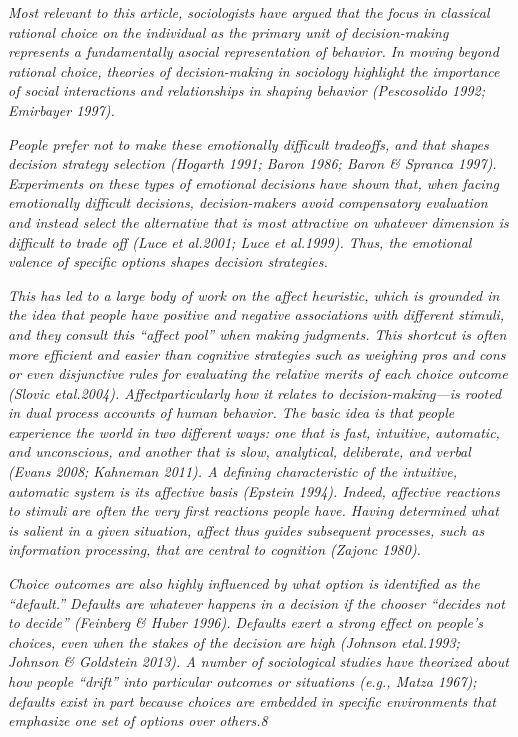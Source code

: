 \documentclass[]{article}
\begin{document}
\textit{Most relevant to this article, sociologists have argued that the focus in classical rational choice on the individual as the primary unit of decision-making represents a fundamentally asocial representation of behavior. In moving beyond rational choice, theories of decision-making in sociology highlight the importance of social interactions and relationships in shaping behavior (Pescosolido 1992; Emirbayer 1997).}

\textit{People prefer not to make these emotionally difficult tradeoffs, and that shapes decision strategy selection (Hogarth 1991; Baron 1986; Baron \& Spranca 1997). Experiments on these types of emotional decisions have shown that, when facing emotionally difficult decisions, decision-makers avoid compensatory evaluation and instead select the alternative that is most attractive on whatever dimension is difficult to trade off (Luce et al.2001; Luce et al.1999). Thus, the emotional valence of specific options shapes decision strategies.}

\textit{This has led to a large body of work on the affect heuristic, which is grounded in the idea that people have positive and negative associations with different stimuli, and they consult this “affect pool” when making judgments. This shortcut is often more efficient and easier than cognitive strategies such as weighing pros and cons or even disjunctive rules for evaluating the relative merits of each choice outcome (Slovic etal.2004). Affectparticularly how it relates to decision-making—is rooted in dual process accounts of human behavior. The basic idea is that people experience the world in two different ways: one that is fast, intuitive, automatic, and unconscious, and another that is slow, analytical, deliberate, and verbal (Evans 2008; Kahneman 2011). A defining characteristic of the intuitive, automatic system is its affective basis (Epstein 1994). Indeed, affective reactions to stimuli are often the very first reactions people have. Having determined what is salient in a given situation, affect thus guides subsequent processes, such as information processing, that are central to cognition (Zajonc 1980).}

\textit{Choice outcomes are also highly influenced by what option is identified as the “default.” Defaults are whatever happens in a decision if the chooser “decides not to decide” (Feinberg \& Huber 1996). Defaults exert a strong effect on people’s choices, even when the stakes of the decision are high (Johnson etal.1993; Johnson \& Goldstein 2013). A number of sociological studies have theorized about how people “drift” into particular outcomes or situations (e.g., Matza 1967); defaults exist in part because choices are embedded in specific environments that emphasize one set of options over others.8}
\end{document}
